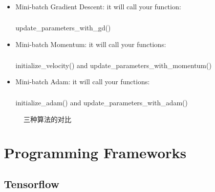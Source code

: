 \documentclass{article}
\begin{document}
\begin{CJK}{UTF8}{gbsn}
\begin{itemize}
\item Mini-batch Gradient Descent: it will call your function:
\subparagraph{}
  update\_{}parameters\_{}with\_{}gd()
\item Mini-batch Momentum: it will call your functions:
\subparagraph{}
  initialize\_{}velocity() and update\_{}parameters\_{}with\_{}momentum()
\item Mini-batch Adam: it will call your functions:
\subparagraph{}
  initialize\_{}adam() and update\_{}parameters\_{}with\_{}adam()
\end{itemize}
\begin{figure}[H]
\label{fig:55}
\caption{三种算法的对比}
\end{figure}
\section{Programming Frameworks}
\subsection{Tensorflow}
\end{CJK}
\end{document}
